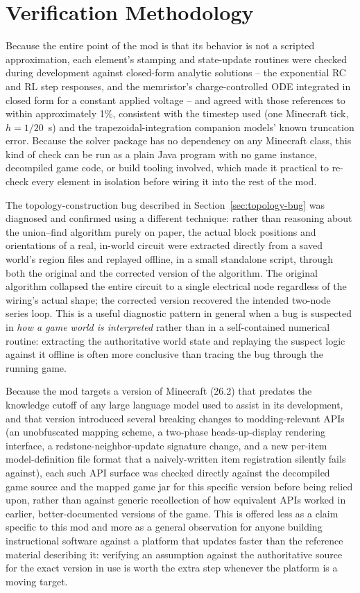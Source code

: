 \section{Verification Methodology}
\label{sec:validation}

Because the entire point of the mod is that its behavior is not a scripted approximation,
each element's stamping and state-update routines were checked during development against
closed-form analytic solutions -- the exponential RC and RL step responses, and the
memristor's charge-controlled ODE integrated in closed form for a constant applied voltage
-- and agreed with those references to within approximately 1\%, consistent with the
timestep used (one Minecraft tick, $h = 1/20$~s) and the trapezoidal-integration companion
models' known truncation error. Because the solver package has no dependency on any
Minecraft class, this kind of check can be run as a plain Java program with no game
instance, decompiled game code, or build tooling involved, which made it practical to
re-check every element in isolation before wiring it into the rest of the mod.

The topology-construction bug described in Section~\ref{sec:topology-bug} was diagnosed and
confirmed using a different technique: rather than reasoning about the union--find algorithm
purely on paper, the actual block positions and orientations of a real, in-world circuit
were extracted directly from a saved world's region files and replayed offline, in a small
standalone script, through both the original and the corrected version of the algorithm.
The original algorithm collapsed the entire circuit to a single electrical node regardless
of the wiring's actual shape; the corrected version recovered the intended two-node series
loop. This is a useful diagnostic pattern in general when a bug is suspected in \emph{how a
game world is interpreted} rather than in a self-contained numerical routine: extracting the
authoritative world state and replaying the suspect logic against it offline is often more
conclusive than tracing the bug through the running game.

Because the mod targets a version of Minecraft (26.2) that predates the knowledge cutoff of
any large language model used to assist in its development, and that version introduced
several breaking changes to modding-relevant APIs (an unobfuscated mapping scheme, a
two-phase heads-up-display rendering interface, a redstone-neighbor-update signature change,
and a new per-item model-definition file format that a naively-written item registration
silently fails against), each such API surface was checked directly against the
decompiled game source and the mapped game jar for this specific version before being relied
upon, rather than against generic recollection of how equivalent APIs worked in earlier,
better-documented versions of the game. This is offered less as a claim specific to this mod
and more as a general observation for anyone building instructional software against a
platform that updates faster than the reference material describing it: verifying an
assumption against the authoritative source for the exact version in use is worth the extra
step whenever the platform is a moving target.

